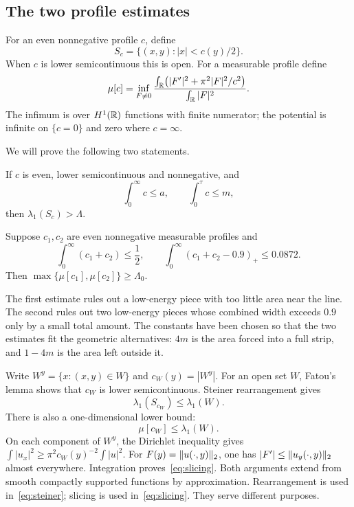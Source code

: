 \subsection{The two profile estimates}
For an even nonnegative profile $c$, define
\[
 S_c=\{(x,y):|x|<c(y)/2\}.
\]
When $c$ is lower semicontinuous this is open. For a measurable profile define
\[
 \mu[c]=\inf_{F\ne0}
 \frac{\int_\mathbb R\bigl(|F'|^2+\pi^2|F|^2/c^2\bigr)}{\int_\mathbb R|F|^2}.
\]
The infimum is over $H^1(\mathbb R)$ functions with finite numerator; the potential is infinite on $\{c=0\}$ and zero where $c=\infty$.

We will prove the following two statements.
\begin{proposition}\label{prop:single}
If $c$ is even, lower semicontinuous and nonnegative, and
\[
 \int_0^\infty c\le a,\qquad \int_0^\tau c\le m,
\]
then $\lambda_1(S_c)>\Lambda$.
\end{proposition}
\begin{proposition}\label{prop:pair}
Suppose $c_1,c_2$ are even nonnegative measurable profiles and
\[
 \int_0^\infty(c_1+c_2)\le\frac12,\qquad
 \int_0^\infty(c_1+c_2-0.9)_+\le0.0872.
\]
Then $\max\{\mu[c_1],\mu[c_2]\}\ge\Lambda_0$.
\end{proposition}
The first estimate rules out a low-energy piece with too little area near the line. The second rules out two low-energy pieces whose combined width exceeds $0.9$ only by a small total amount. The constants have been chosen so that the two estimates fit the geometric alternatives: $4m$ is the area forced into a full strip, and $1-4m$ is the area left outside it.

Write $W^y=\{x:(x,y)\in W\}$ and $c_W(y)=|W^y|$. For an open set $W$, Fatou's lemma shows that $c_W$ is lower semicontinuous. Steiner rearrangement gives
\begin{equation}\label{eq:steiner}
 \lambda_1(S_{c_W})\le\lambda_1(W).
\end{equation}
There is also a one-dimensional lower bound:
\begin{equation}\label{eq:slicing}
 \mu[c_W]\le\lambda_1(W).
\end{equation}
On each component of $W^y$, the Dirichlet inequality gives $\int|u_x|^2\ge\pi^2c_W(y)^{-2}\int|u|^2$. For $F(y)=\lVert u(\cdot,y)\rVert_2$, one has $|F'|\le\lVert u_y(\cdot,y)\rVert_2$ almost everywhere. Integration proves~\eqref{eq:slicing}. Both arguments extend from smooth compactly supported functions by approximation. Rearrangement is used in~\eqref{eq:steiner}; slicing is used in~\eqref{eq:slicing}. They serve different purposes.

